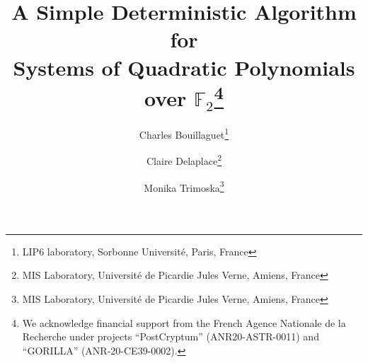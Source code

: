\documentclass[twoside,leqno]{article}
\begin{document}
%
\newcommand\relatedversion{}



\title{\Large A Simple Deterministic Algorithm for \\ Systems of Quadratic Polynomials over $\mathbb{F}_2$\thanks{We acknowledge financial support from the French Agence Nationale de la
  Recherche under projects ``PostCryptum'' (ANR20-ASTR-0011) and ``GORILLA''
  (ANR-20-CE39-0002).}}
\author{Charles Bouillaguet\thanks{LIP6 laboratory, Sorbonne Université, Paris, France}
\and Claire Delaplace\thanks{MIS Laboratory, Université de Picardie Jules Verne, Amiens, France}
\and Monika Trimoska\thanks{MIS Laboratory, Université de Picardie Jules Verne, Amiens, France}}

\date{}

\maketitle





\end{document}
